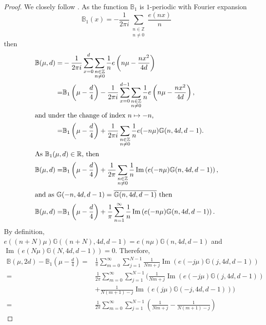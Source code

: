 \documentclass[12pt, a4paper]{article}
\newcommand{\RR}{\mathbb{R}}
\newcommand{\BB}{\mathbb{B}}
\newcommand{\GG}{\mathbb{G}}
\newcommand{\ZZ}{\mathbb{Z}}
\newcommand{\opn}{\operatorname}
\begin{document}
\begin{proof}
  We closely follow \cite[Lemma 5]{BruinierPicard}. 
As the function $\BB_1$ is $1$-periodic with Fourier expansion
  \[
  \BB_1(x) = -\frac{1}{2 \pi i} \sum_{\substack{n \in \ZZ \\ n \neq 0 }} \frac{e(nx)}{n} 
  \]
  then 
  \begin{align*}
    \BB(\mu, d)
    = & - \frac{1}{2 \pi i} \sum_{x=0}^{d} \sum_{\substack{n \in \ZZ \\ n \neq 0 }} \frac{1}{n} e \left ( n \mu - \frac{nx^2}{4d} \right ) \\
    =& \BB_1 \left (\mu - \frac{d}{4} \right ) - \frac{1}{2 \pi i} \sum_{x=0}^{d-1} \sum_{\substack{n \in \ZZ \\ n \neq 0 }} \frac{1}{n} e \left ( n \mu - \frac{nx^2}{4d} \right ), \\
    \intertext{and under the change of index $n \mapsto -n$,}
    = & \BB_1\left ( \mu - \frac{d}{4} \right ) + \frac{1}{2 \pi i}  \sum_{\substack{n \in \ZZ \\ n \neq 0 }} \frac{1}{n} e(-n \mu) \GG(n, 4d, d-1). \\
 \intertext{As $\BB_1(\mu, d) \in \RR$, then}
    \BB(\mu, d)
  = & \BB_1\left ( \mu - \frac{d}{4} \right ) + \frac{1}{2 \pi} \sum_{\substack{n \in \ZZ \\ n \neq 0}} \frac{1}{n}
  \opn{Im} \left ( e(-n \mu) \GG(n, 4d, d-1) \right ), \\
  \intertext{and as $\GG(-n, 4d, d-1) = \overline{\GG(n, 4d, d-1)}$ then}
  \BB(\mu, d)
  = & \BB_1\left ( \mu - \frac{d}{4} \right ) + \frac{1}{\pi} \sum_{n=1}^{\infty} \frac{1}{n} \opn{Im} \left ( e(-n \mu) \GG(n, 4d, d-1) \right ).
  \end{align*}
  By definition, $e((n+N)\mu) \GG((n+N), 4d, d-1) = e(n \mu) \GG(n, 4d, d-1)$ and $\opn{Im}(e(N \mu) \GG(N, 4d, d-1)) = 0$.
  Therefore, 
  \begin{align*}
    \BB(\mu, 2d) - \BB_1\left ( \mu - \frac{d}{4} \right ) 
    = & \frac{1}{\pi } \sum_{m=0}^{\infty} \sum_{j=1}^{N-1} \frac{1}{Nm + j} \opn{Im} \left ( e(-j \mu) \GG(j, 4d, d-1) \right ) \\
    = & \frac{1}{2 \pi} \sum_{m=0}^{\infty} \sum_{j=1}^{N-1} \biggl (
    \frac{1}{Nm + j} \opn{Im} \left ( e(-j \mu) \GG(j, 4d, d-1) \right ) \\
    & +
    \frac{1}{N(m+1) - j} \opn{Im} \left ( e(j \mu) \GG(-j, 4d, d-1) \right ) \biggr ) \\
    = & \frac{1}{2 \pi} \sum_{m=0}^{\infty} \sum_{j=1}^{N-1}
    \left ( \frac{1}{Nm + j } - \frac{1}{N(m+1) - j} \right )

\end{align*}
\end{proof}
\end{document}
